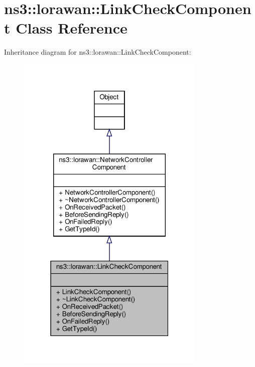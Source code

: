 \hypertarget{classns3_1_1lorawan_1_1LinkCheckComponent}{}\section{ns3\+:\+:lorawan\+:\+:Link\+Check\+Component Class Reference}
\label{classns3_1_1lorawan_1_1LinkCheckComponent}


Inheritance diagram for ns3\+:\+:lorawan\+:\+:Link\+Check\+Component\+:
\nopagebreak
\begin{figure}[H]
\begin{center}
\leavevmode
\includegraphics[width=255pt]{classns3_1_1lorawan_1_1LinkCheckComponent__inherit__graph}
\end{center}
\end{figure}


